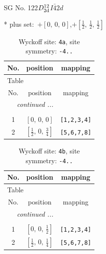 \documentclass[fleqn,8pt]{jsarticle}
\begin{document}
\setcounter{MaxMatrixCols}{32}

\renewcommand{\tablename}{Table~}
\renewcommand{\figurename}{Figure~}
\begin{center}
\LARGE
SG No. 122\quad$D_{\rm 2d}^{12}$\quad$I\bar{4}2d$\quad[ tetragonal ]
\end{center}
* plus set:\,\,\,$+\left[ 0,\, 0,\, 0 \right]$,\quad $+\left[ \frac{1}{2},\, \frac{1}{2},\, \frac{1}{2} \right]$
\renewcommand{\arraystretch}{1.2}
\begin{longtable}{ccc}
\caption{Wyckoff site: {\tt 4a}, site symmetry: {\tt -4..}}
 \\
 \hline \hline
No. & position & mapping \\ \hline \endfirsthead

\multicolumn{2}{l}{\tablename\ \thetable{}} \\
 \hline \hline
No. & position & mapping \\ \hline \endhead

 \hline \hline
\multicolumn{2}{r}{\footnotesize\it continued ...} \\ \endfoot

 \hline \hline
\multicolumn{2}{r}{} \\ \endlastfoot

1 & $\left[ 0,\, 0,\, 0 \right]$ & {\tt [1,2,3,4]} \\ \hline
2 & $\left[ \frac{1}{2},\, 0,\, \frac{3}{4} \right]$ & {\tt [5,6,7,8]} \\
\end{longtable}
\renewcommand{\arraystretch}{1.2}
\begin{longtable}{ccc}
\caption{Wyckoff site: {\tt 4b}, site symmetry: {\tt -4..}}
 \\
 \hline \hline
No. & position & mapping \\ \hline \endfirsthead

\multicolumn{2}{l}{\tablename\ \thetable{}} \\
 \hline \hline
No. & position & mapping \\ \hline \endhead

 \hline \hline
\multicolumn{2}{r}{\footnotesize\it continued ...} \\ \endfoot

 \hline \hline
\multicolumn{2}{r}{} \\ \endlastfoot

1 & $\left[ 0,\, 0,\, \frac{1}{2} \right]$ & {\tt [1,2,3,4]} \\ \hline
2 & $\left[ \frac{1}{2},\, 0,\, \frac{1}{4} \right]$ & {\tt [5,6,7,8]} \\
\end{longtable}
\end{document}
